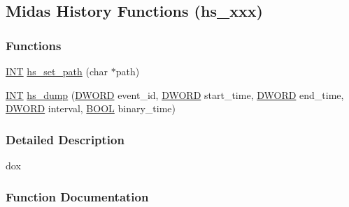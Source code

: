 \subsection{Midas History Functions (hs\_\-xxx)}
\label{group__hsfunctioncode}
\subsubsection*{Functions}
\begin{DoxyCompactItemize}
\item 
\hyperlink{vppg_8h_a392e62da233ed3e2f7c3fd4f487a3896}{INT} \hyperlink{group__hsfunctioncode_gadd381765666fd1aa3395b63b86d44887}{hs\_\-set\_\-path} (char $\ast$path)
\item 
\hyperlink{vppg_8h_a392e62da233ed3e2f7c3fd4f487a3896}{INT} \hyperlink{group__hsfunctioncode_gaa0adfd626d570a1e37a01f2f8b8afdfd}{hs\_\-dump} (\hyperlink{vt2_8h_a798af1e30bc65f319c1a246cecf59e39}{DWORD} event\_\-id, \hyperlink{vt2_8h_a798af1e30bc65f319c1a246cecf59e39}{DWORD} start\_\-time, \hyperlink{vt2_8h_a798af1e30bc65f319c1a246cecf59e39}{DWORD} end\_\-time, \hyperlink{vt2_8h_a798af1e30bc65f319c1a246cecf59e39}{DWORD} interval, \hyperlink{vt2_8h_a239c7f0d40651c3e419c5b9651507d14}{BOOL} binary\_\-time)
\end{DoxyCompactItemize}


\subsubsection{Detailed Description}
dox 

\subsubsection{Function Documentation}
